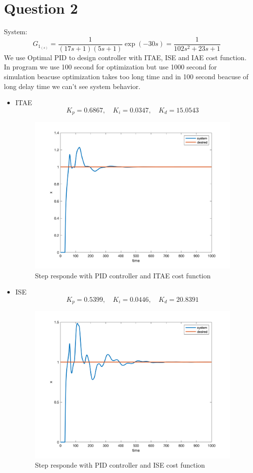 \section{Question 2}
System:
$$
G_{1_{(s)}} = \dfrac{1}{(17s+1)(5s+1)}\exp(-30s) = \dfrac{1}{102s^2+23s+1}
$$
We use Optimal PID to design controller with ITAE, ISE and IAE cost function. In program we use 100 second for optimization but use 1000 second for simulation beacuse optimization takes too long time and in 100 second beacuse of long delay time we can't see system behavior. 
\newpage
 \begin{itemize}
     \item ITAE
     $$
     K_p = 0.6867, \quad K_i = 0.0347, \quad K_d = 15.0543
     $$
     \begin{figure}[H]
        \caption{Step responde with PID controller and ITAE cost function}
        \centering
        \includegraphics[width=11cm]{../Figure/Q2/ITAE.png}
    \end{figure}
    \item ISE
    $$
    K_p =0.5399, \quad K_i = 0.0446, \quad  K_d =20.8391
    $$
    \begin{figure}[H]
       \caption{Step responde with PID controller and ISE cost function}
       \centering
       \includegraphics[width=11cm]{../Figure/Q2/ISE.png}

\end{figure}
\end{itemize}

